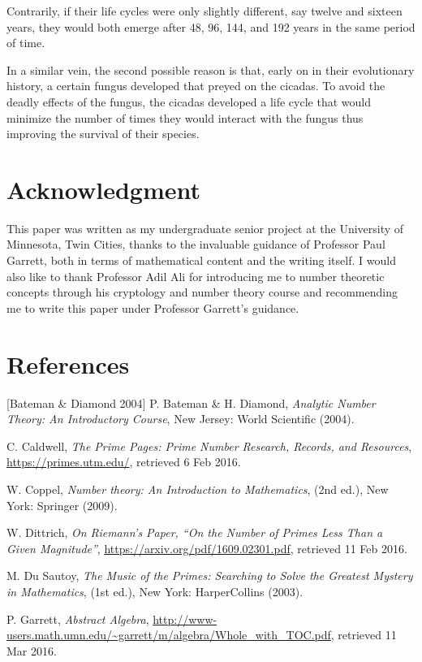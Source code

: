 \documentclass[11pt]{article}
\begin{document}
Contrarily, if their life cycles were only slightly different, say twelve and sixteen years, they would both emerge after 48, 96, 144, and 192 years in the same period of time. 

In a similar vein, the second possible reason is that, early on in their evolutionary history, a certain fungus developed that preyed on the cicadas. To avoid the deadly effects of the fungus, the cicadas developed a life cycle that would minimize the number of times they would interact with the fungus thus improving the survival of their species. 

\section{Acknowledgment}
This paper was written as my undergraduate senior project at the University of Minnesota, Twin Cities, thanks to the invaluable guidance of Professor Paul Garrett, both in terms of mathematical content and the writing itself. I would also like to thank Professor Adil Ali for introducing me to number theoretic concepts through his cryptology and number theory course and recommending me to write this paper under Professor Garrett's guidance.  

\pagebreak
\section{References}
[Bateman \& Diamond 2004] P. Bateman \& H. Diamond, {\it Analytic Number Theory: An Introductory Course}, New Jersey: World Scientific (2004).

\medskip
\noindent
[Caldwell 2017] C. Caldwell, {\it The Prime Pages: Prime Number Research, Records, and Resources}, \url{https://primes.utm.edu/}, retrieved 6 Feb 2016.

\medskip
\noindent
[Coppel 2006] W. Coppel, {\it Number theory: An Introduction to Mathematics}, (2nd ed.), New York: Springer (2009).

\medskip
\noindent
[Dittrich 2016] W. Dittrich, {\it On Riemann's Paper, “On the Number of Primes Less Than a Given Magnitude”}, \url{https://arxiv.org/pdf/1609.02301.pdf}, retrieved 11 Feb 2016.

\medskip
\noindent
[Du Sautoy 2003] M. Du Sautoy, {\it The Music of the Primes: Searching to Solve the Greatest Mystery in Mathematics}, (1st ed.), New York: HarperCollins (2003).

\medskip
\noindent
[Garrett 2007] P. Garrett, {\it Abstract Algebra}, \url{http://www-users.math.umn.edu/~garrett/m/algebra/Whole_with_TOC.pdf}, retrieved 11 Mar 2016.
\end{document}
